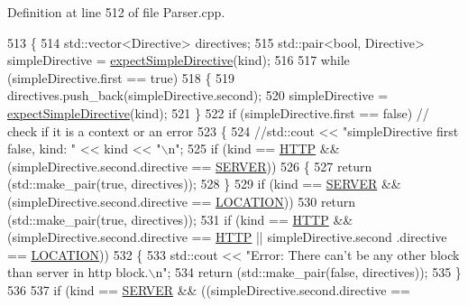 Definition at line 512 of file Parser.\+cpp.


\begin{DoxyCode}
513     \{
514         std::vector<Directive>  directives;
515         std::pair<bool, Directive> simpleDirective = \hyperlink{classft_1_1_parser_a292bf0ed87b8e81b59cefb72c70152bd}{expectSimpleDirective}(kind);
516 
517         \textcolor{keywordflow}{while} (simpleDirective.first == \textcolor{keyword}{true})
518         \{
519             directives.push\_back(simpleDirective.second);
520             simpleDirective = \hyperlink{classft_1_1_parser_a292bf0ed87b8e81b59cefb72c70152bd}{expectSimpleDirective}(kind);
521         \}
522         \textcolor{keywordflow}{if} (simpleDirective.first == \textcolor{keyword}{false}) \textcolor{comment}{// check if it is a context or an error}
523         \{
524             \textcolor{comment}{//std::cout << "simpleDirective first false, kind: " << kind << "\(\backslash\)n";}
525             \textcolor{keywordflow}{if} (kind == \hyperlink{namespaceft_a5a5554dff10f0dc50bae4cc5825ad75da67e044074f46e6cea22788527da5f02e}{HTTP} && (simpleDirective.second.directive == \hyperlink{namespaceft_a5a5554dff10f0dc50bae4cc5825ad75da67c96b24b23bcb408bae7626730a04b7}{SERVER}))
526             \{
527                 \textcolor{keywordflow}{return} (std::make\_pair(\textcolor{keyword}{true}, directives));
528             \}
529             \textcolor{keywordflow}{if} (kind == \hyperlink{namespaceft_a5a5554dff10f0dc50bae4cc5825ad75da67c96b24b23bcb408bae7626730a04b7}{SERVER} && (simpleDirective.second.directive == 
      \hyperlink{namespaceft_a5a5554dff10f0dc50bae4cc5825ad75da1e9e3944b93fde52c7c92e1e15dcaf4a}{LOCATION}))
530                 \textcolor{keywordflow}{return} (std::make\_pair(\textcolor{keyword}{true}, directives));
531             \textcolor{keywordflow}{if} (kind == \hyperlink{namespaceft_a5a5554dff10f0dc50bae4cc5825ad75da67e044074f46e6cea22788527da5f02e}{HTTP} && (simpleDirective.second.directive == \hyperlink{namespaceft_a5a5554dff10f0dc50bae4cc5825ad75da67e044074f46e6cea22788527da5f02e}{HTTP} || simpleDirective.second
      .directive == \hyperlink{namespaceft_a5a5554dff10f0dc50bae4cc5825ad75da1e9e3944b93fde52c7c92e1e15dcaf4a}{LOCATION}))
532             \{
533                 std::cout << \textcolor{stringliteral}{"Error: There can't be any other block than server in http block.\(\backslash\)n"};
534                 \textcolor{keywordflow}{return} (std::make\_pair(\textcolor{keyword}{false}, directives));
535             \}
536             
537             \textcolor{keywordflow}{if} (kind == \hyperlink{namespaceft_a5a5554dff10f0dc50bae4cc5825ad75da67c96b24b23bcb408bae7626730a04b7}{SERVER} && ((simpleDirective.second.directive == 

\end{DoxyCode}
